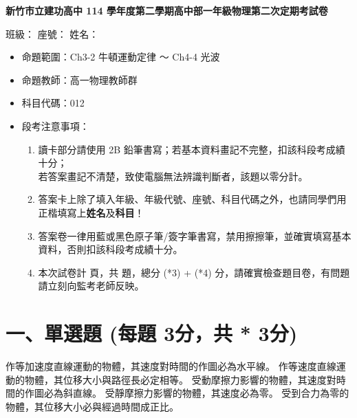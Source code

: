 \documentclass[10pt,a4paper]{article}
\newcommand{\scscore}{3}
\newcommand{\mcscore}{4}
\newcommand{\examheader}{
    \begin{center}
        \Large \textbf{新竹市立建功高中 114 學年度第二學期高中部一年級物理第二次定期考試卷}
    \end{center}
}
\begin{document}
\examheader

\noindent \hspace*{\fill} \large 班級：\underline{\hspace{1.5cm}} 座號：\underline{\hspace{1cm}} 姓名：\underline{\hspace{2.5cm}}

\vspace{1em}

\begin{itemize}[leftmargin=1em]
    \item[$\ast$] 命題範圍：Ch3-2 牛頓運動定律 ～ Ch4-4 光波
    \item[$\ast$] 命題教師：高一物理教師群
    \item[$\ast$] 科目代碼：012
    \item[$\ast$] 段考注意事項：
    \begin{enumerate}[label=\arabic*., leftmargin=2em]
        \item 讀卡部分請使用 2B 鉛筆書寫；若基本資料畫記不完整，扣該科段考成績十分；\\若答案畫記不清楚，致使電腦無法辨識判斷者，該題以零分計。
        \item 答案卡上除了填入年級、年級代號、座號、科目代碼之外，也請同學們用正楷填寫上\textbf{姓名}及\textbf{科目}！
        \item 答案卷一律用藍或黑色原子筆/簽字筆書寫，禁用擦擦筆，並確實填寫基本資料，否則扣該科段考成績十分。
        \item 本次試卷計 \pageref{LastPage} 頁，共  題，總分 \the\numexpr (*\scscore) + (*\mcscore) \relax 分，請確實檢查題目卷，有問題請立刻向監考老師反映。
    \end{enumerate}
\end{itemize}

\section*{一、單選題 (每題 \scscore 分，共 \the\numexpr {} * \scscore \relax 分)}
{作等加速度直線運動的物體，其速度對時間的作圖必為水平線。}
{作等速度直線運動的物體，其位移大小與路徑長必定相等。}
{受動摩擦力影響的物體，其速度對時間的作圖必為斜直線。}
{受靜摩擦力影響的物體，其速度必為零。}
{受到合力為零的物體，其位移大小必與經過時間成正比。}
\end{document}
